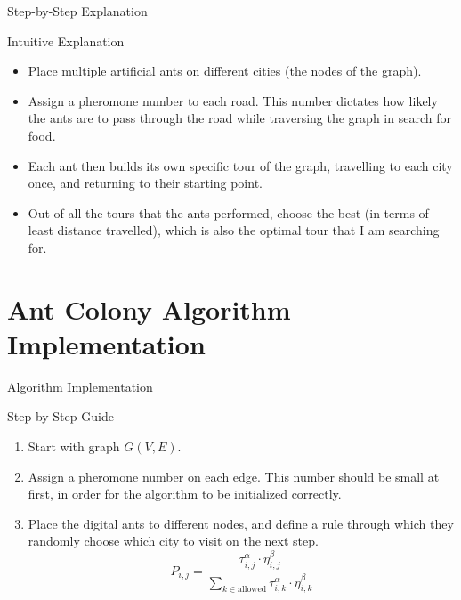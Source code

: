 \documentclass[aspectratio=169,xcolor=dvipsnames, t]{beamer}
\begin{document}
\begin{frame}{Step-by-Step Explanation}
	\vspace{-5mm}
	\onslide<2->\begin{block}{Intuitive Explanation}
		\begin{itemize}
			\item<2-> Place multiple artificial ants on different cities (the nodes of the graph).
			\item<3-> Assign a pheromone number to each road. This number dictates how likely the ants are to pass through the road while traversing the graph in search for food.
			\item<4-> Each ant then builds its own specific tour of the graph, travelling to each city once, and returning to their starting point.
			\item<5-> Out of all the tours that the ants performed, choose the best (in terms of least distance travelled), which is also the optimal tour that I am searching for.
		\end{itemize}
	\end{block}
\end{frame}

\section{Ant Colony Algorithm Implementation}
\begin{frame}{Algorithm Implementation}
	\vspace{-5mm}
	\onslide<2->\begin{block}{Step-by-Step Guide}
		\begin{enumerate}
			\item<2-> Start with graph \( G(V, E) \).
			\item<3-> Assign a pheromone number on each edge. This number should be small at first, in order for the algorithm to be initialized correctly.
			\item<4-> Place the digital ants to different nodes, and define a rule through which they randomly choose which city to visit on the next step.
				\[
					P_{i,j} = \frac{\tau_{i,j}^{\alpha} \cdot \eta_{i,j}^{\beta}}{\sum_{k \in \text{allowed}} \tau_{i,k}^{\alpha} \cdot \eta_{i,k}^{\beta}}
				\]
		\end{enumerate}
	\end{block}
\end{frame}
\end{document}
